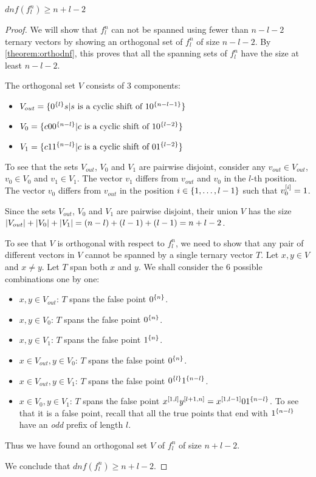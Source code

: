 \begin{lemma}
$dnf(f_l^n) \geq n+l-2$
\end{lemma}

\begin{proof}
We will show that $f_l^n$ can not be spanned
using fewer than $n-l-2$ ternary vectors
by showing an orthogonal set of $f_l^n$ of size $n-l-2$.
By \autoref{theorem:orthodnf},
this proves that all the spanning sets of $f_l^n$
have the size at least $n-l-2$.

The orthogonal set $V$ consists of 3 components:
\begin{itemize}
\item
$V_{out} = \{0^{\{l\}} s
| s \text{ is a cyclic shift of } 1 0^{\{n-l-1\}}\}$
\item
$V_0 = \{c 0 0^{\{n-l\}}
| c \text{ is a cyclic shift of } 1 0^{\{l-2\}}\}$
\item
$V_1 = \{c 1 1^{\{n-l\}}
| c \text{ is a cyclic shift of } 0 1^{\{l-2\}}\}$
\end{itemize}

To see that the sets $V_{out}$, $V_0$ and $V_1$
are pairwise disjoint,
consider any $v_{out} \in V_{out}$,
$v_0 \in V_0$ and $v_1 \in V_1$.
The vector $v_1$ differs from $v_{out}$ and $v_0$
in the $l$-th position.
The vector $v_0$ differs from $v_{out}$
in the position $i \in \{1, \ldots, l-1\}$
such that $v_0^{[i]} = 1$.

Since the sets $V_{out}$, $V_0$ and $V_1$
are pairwise disjoint,
their union $V$
has the size
$\lvert V_{out}\rvert + \lvert V_0\rvert + \lvert V_1\rvert
= (n-l) + (l-1) + (l-1) = n+l-2$.

To see that $V$ is orthogonal with respect to $f^n_l$,
we need to show that any pair of different vectors in $V$
cannot be spanned by a single ternary vector $T$.
Let $x,y \in V$ and $x \neq y$.
Let $T$ span both $x$ and $y$.
We shall consider the 6 possible combinations one by one:
\begin{itemize}
\item $x,y \in V_{out}$:
$T$ spans the false point $0^{\{n\}}$.
\item $x,y \in V_0$:
$T$ spans the false point $0^{\{n\}}$.
\item $x,y \in V_1$:
$T$ spans the false point $1^{\{n\}}$.
\item $x \in V_{out}, y \in V_0$:
$T$ spans the false point $0^{\{n\}}$.
\item $x \in V_{out}, y \in V_1$:
$T$ spans the false point $0^{\{l\}} 1^{\{n-l\}}$.
\item $x \in V_0, y \in V_1$:
$T$ spans the false point
$x^{[1, l]} y^{[l+1, n]}
= x^{[1, l-1]} 0 1^{\{n-l\}}$.
To see that it is a false point,
recall that
all the true points that end with $1^{\{n-l\}}$
have an \emph{odd} prefix of length $l$.
\end{itemize}

Thus we have found an orthogonal set $V$ of $f_l^n$
of size $n+l-2$.

We conclude that $dnf(f_l^n) \geq n+l-2$.
\end{proof}


